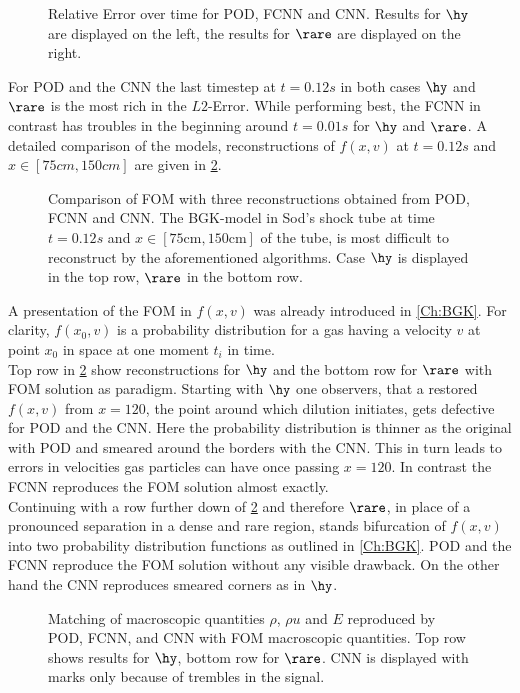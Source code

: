 \begin{figure}[htbp!]
	
	\caption{Relative Error over time for POD, FCNN and CNN. Results for $\hy$ are displayed on the left, the results for $\rare$ are displayed on the right.}
	\label{Fig:ErrTime}
\end{figure}
For POD and the CNN the last timestep at $t=0.12s$ in both cases $\hy$ and $\rare$ is the most rich in the $L2$-Error. While performing best, the FCNN in contrast has troubles in the beginning around $t=0.01s$ for $\hy$ and $\rare$. A detailed comparison of the models, reconstructions of $f(x,v)$ at $t=0.12s$ and $x \in [75cm,150cm]$ are given in \cref{Fig:ErrWorst}.
\begin{figure}[H]
	
	\caption{Comparison of FOM with three reconstructions obtained from POD, FCNN and CNN. The BGK-model in Sod's shock tube at time \(t=0.12s\) and \(x\in [75\textrm{cm}, 150\textrm{cm}]\) of the tube, is most difficult to reconstruct by the aforementioned algorithms. Case $\hy$ is displayed in the top row, $\rare$ in the bottom row. }
	\label{Fig:ErrWorst}
\end{figure}
A presentation of the FOM in $f(x,v)$ was already introduced in \cref{Ch:BGK}. For clarity, $f(x_0,v)$ is a probability distribution for a gas having a velocity $v$ at point $x_0$ in space at one moment $t_i$ in time.\\
Top row in \cref{Fig:ErrWorst} show reconstructions for $\hy$ and the bottom row for $\rare$ with FOM solution as paradigm. Starting with \(\hy\) one observers, that a restored \(f(x,v)\) from \(x=120\), the point around which dilution initiates, gets defective for POD and the CNN. Here the probability distribution is thinner as the original with POD and smeared around the borders with the CNN. This in turn leads to errors in velocities gas particles can have once passing \(x=120\). In contrast the FCNN reproduces the FOM solution almost exactly.\\
Continuing with a row further down of \cref{Fig:ErrWorst} and therefore \(\rare\), in place of a pronounced separation in a dense and rare region, stands bifurcation of \(f(x,v)\) into two probability distribution functions as outlined in \cref{Ch:BGK}. POD and the FCNN reproduce the FOM solution without any visible drawback. On the other hand the CNN reproduces smeared corners as in \(\hy\).   
\begin{figure}[H]
	
	\caption{Matching of macroscopic quantities \(\rho\), \(\rho u\) and \(E\) reproduced by POD, FCNN, and CNN with FOM macroscopic quantities. Top row shows results for \(\hy\), bottom row for \(\rare\). CNN is displayed with marks only because of trembles in the signal.}
	\label{Fig:ErrMacro}
\end{figure}
